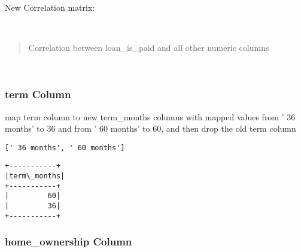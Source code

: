 \documentclass[11pt]{article}
\makeatletter
\newcommand{\boxspacing}{\kern\kvtcb@left@rule\kern\kvtcb@boxsep}
\newcommand{\prompt}[4]{
        {\ttfamily\llap{{\color{#2}[#3]:\hspace{3pt}#4}}\vspace{-\baselineskip}}
    }
\makeatother
\begin{document}
    New Correlation matrix:

    \begin{center}
    \end{center}
    { \hspace*{\fill} \\}
    
    \begin{quote}
Correlation between loan\_is\_paid and all other numeric columns
\end{quote}

    \begin{center}
    \end{center}
    { \hspace*{\fill} \\}
    
    \hypertarget{term-column}{%
\subsubsection{term Column}\label{term-column}}

    map term column to new term\_months columns with mapped values from ' 36
months' to 36 and from ' 60 months' to 60, and then drop the old term
column

            \begin{tcolorbox}[breakable, size=fbox, boxrule=.5pt, pad at break*=1mm, opacityfill=0]
\prompt{Out}{outcolor}{44}{\boxspacing}
\begin{Verbatim}[commandchars=\\\{\}]
[' 36 months', ' 60 months']
\end{Verbatim}
\end{tcolorbox}
        
    \begin{Verbatim}[commandchars=\\\{\}]
+-----------+
|term\_months|
+-----------+
|         60|
|         36|
+-----------+

    \end{Verbatim}

    \hypertarget{home_ownership-column}{%
\subsubsection{home\_ownership Column}\label{home_ownership-column}}
\end{document}
